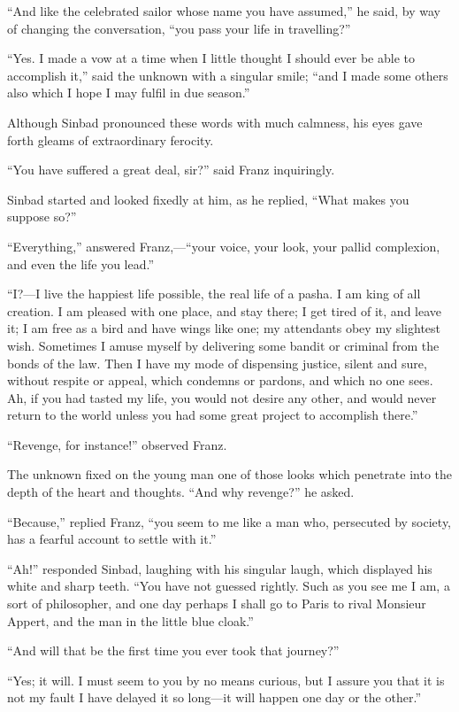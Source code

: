 “And like the celebrated sailor whose name you have assumed,” he said,
by way of changing the conversation, “you pass your life in
travelling?”

“Yes. I made a vow at a time when I little thought I should ever be
able to accomplish it,” said the unknown with a singular smile; “and I
made some others also which I hope I may fulfil in due season.”

Although Sinbad pronounced these words with much calmness, his eyes
gave forth gleams of extraordinary ferocity.

“You have suffered a great deal, sir?” said Franz inquiringly.

Sinbad started and looked fixedly at him, as he replied, “What makes
you suppose so?”

“Everything,” answered Franz,—“your voice, your look, your pallid
complexion, and even the life you lead.”

“I?—I live the happiest life possible, the real life of a pasha. I am
king of all creation. I am pleased with one place, and stay there; I
get tired of it, and leave it; I am free as a bird and have wings like
one; my attendants obey my slightest wish. Sometimes I amuse myself by
delivering some bandit or criminal from the bonds of the law. Then I
have my mode of dispensing justice, silent and sure, without respite or
appeal, which condemns or pardons, and which no one sees. Ah, if you
had tasted my life, you would not desire any other, and would never
return to the world unless you had some great project to accomplish
there.”

“Revenge, for instance!” observed Franz.

The unknown fixed on the young man one of those looks which penetrate
into the depth of the heart and thoughts. “And why revenge?” he asked.

“Because,” replied Franz, “you seem to me like a man who, persecuted by
society, has a fearful account to settle with it.”

“Ah!” responded Sinbad, laughing with his singular laugh, which
displayed his white and sharp teeth. “You have not guessed rightly.
Such as you see me I am, a sort of philosopher, and one day perhaps I
shall go to Paris to rival Monsieur Appert, and the man in the little
blue cloak.”

“And will that be the first time you ever took that journey?”

“Yes; it will. I must seem to you by no means curious, but I assure you
that it is not my fault I have delayed it so long—it will happen one
day or the other.”

